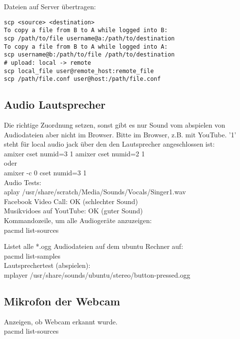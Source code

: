 Dateien auf Server übertragen:
\begin{verbatim}
scp <source> <destination>
To copy a file from B to A while logged into B:
scp /path/to/file username@a:/path/to/destination
To copy a file from B to A while logged into A:
scp username@b:/path/to/file /path/to/destination
# upload: local -> remote
scp local_file user@remote_host:remote_file
scp /path/file.conf user@host:/path/file.conf
\end{verbatim}


\subsection{Audio Lautsprecher}

Die richtige Zuordnung setzen, sonst gibt es nur Sound vom 
abspielen von Audiodateien aber nicht im Browser. Bitte im 
Browser, z.B. mit YouTube. '1' steht für local audio jack über 
den den Lautsprecher angeschlossen ist:\\
amixer cset numid=3 1
amixer cset numid=2 1\\
oder \\
amixer -c 0 cset numid=3 1\\

Audio Tests:\\
aplay /usr/share/scratch/Media/Sounds/Vocals/Singer1.wav\\
Facebook Video Call: OK (schlechter Sound)\\
Musikvidoes auf YoutTube: OK (guter Sound)\\

Kommandozeile, um alle Audiogeräte anzuzeigen:\\
pacmd list-sources

Listet alle *.ogg Audiodateien auf dem ubuntu Rechner auf:\\
pacmd list-samples\\
Lautsprechertest (abspielen):\\
mplayer /usr/share/sounds/ubuntu/stereo/button-pressed.ogg 

\subsection{Mikrofon der Webcam}
Anzeigen, ob Webcam erkannt wurde.\\
pacmd list-sources\\ 

